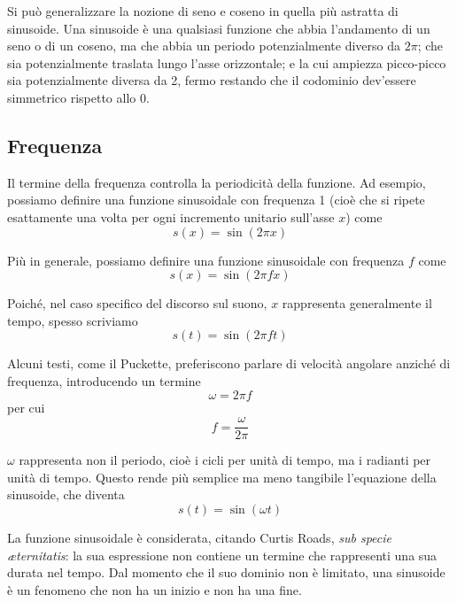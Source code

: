 Si può generalizzare la nozione di seno e coseno in quella più astratta di sinusoide. Una sinusoide è una qualsiasi funzione che abbia l'andamento di un seno o di un coseno, ma che abbia un periodo potenzialmente diverso da $2 \pi$; che sia potenzialmente traslata lungo l'asse orizzontale; e la cui ampiezza picco-picco sia potenzialmente diversa da 2, fermo restando che il codominio dev'essere simmetrico rispetto allo 0.

\subsection{Frequenza}

Il termine della frequenza controlla la periodicità della funzione. Ad esempio, possiamo definire una funzione sinusoidale con frequenza 1 (cioè che si ripete esattamente una volta per ogni incremento unitario sull'asse $x$) come
\begin{equation}
s(x) = \sin(2 \pi x)
\end{equation}

Più in generale, possiamo definire una funzione sinusoidale con frequenza $f$ come
\begin{equation}
s(x) = \sin({2 \pi} f x)
\end{equation}

Poiché, nel caso specifico del discorso sul suono, $x$ rappresenta generalmente il tempo, spesso scriviamo
\begin{equation}
s(t) = \sin({2 \pi} f t)
\end{equation}

Alcuni testi, come il Puckette, preferiscono parlare di velocità angolare anziché di frequenza, introducendo un termine
\begin{equation}
\omega = 2 \pi f
\end{equation}
per cui
\begin{equation}
f = \frac{\omega}{2 \pi}
\end{equation}

$\omega$ rappresenta non il periodo, cioè i cicli per unità di tempo, ma i radianti per unità di tempo. Questo rende più semplice ma meno tangibile l'equazione della sinusoide, che diventa
\begin{equation}
s(t) = \sin(\omega t)
\end{equation}

La funzione sinusoidale è considerata, citando Curtis Roads, \emph{sub specie \ae{}ternitatis}: la sua espressione non contiene un termine che rappresenti una sua durata nel tempo. Dal momento che il suo dominio non è limitato, una sinusoide è un fenomeno che non ha un inizio e non ha una fine.


